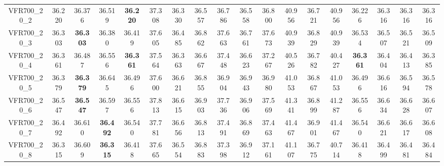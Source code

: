 \begin{tabular}{cc|ccc|ccccccccccccc}
VFR700\_20\_2      & 36.220           & 36.376           & 36.519           & {\bf 36.220}     & 37.308           & 36.330           & 36.557           & 36.786           & 36.558           & 36.800           & 40.956           & 36.721           & 40.956           & 36.226           & 36.316           & 36.316           & 36.316          \\ 
VFR700\_20\_3      & 36.303           & {\bf 36.303}     & 36.380           & 36.419           & 37.605           & 36.485           & 36.862           & 37.663           & 36.761           & 37.673           & 40.939           & 36.829           & 40.939           & 36.534           & 36.507           & 36.521           & 36.509          \\ 
VFR700\_20\_4      & 36.361           & 36.487           & 36.556           & {\bf 36.361}     & 37.564           & 36.363           & 36.667           & 37.448           & 36.623           & 37.267           & 40.526           & 36.782           & 40.427           & {\bf 36.361}     & 36.404           & 36.413           & 36.385          \\ 
VFR700\_20\_5      & 36.379           & {\bf 36.379}     & 36.645           & 36.496           & 37.600           & 36.621           & 36.855           & 36.904           & 36.943           & 36.980           & 41.053           & 36.867           & 41.053           & 36.496           & 36.616           & 36.594           & 36.578          \\ 
VFR700\_20\_6      & 36.547           & {\bf 36.547}     & 36.597           & 36.556           & 37.813           & 36.615           & 36.903           & 37.736           & 36.906           & 37.569           & 41.341           & 36.899           & 41.287           & 36.556           & 36.634           & 36.628           & 36.607          \\ 
VFR700\_20\_7      & 36.492           & 36.610           & {\bf 36.492}     & 36.540           & 37.781           & 36.656           & 36.813           & 37.491           & 36.869           & 37.463           & 41.467           & 36.901           & 41.467           & 36.540           & 36.621           & 36.617           & 36.608          \\ 
VFR700\_20\_8      & 36.315           & 36.609           & {\bf 36.315}     & 36.418           & 37.665           & 36.554           & 36.883           & 37.398           & 36.912           & 37.161           & 41.107           & 36.775           & 40.714           & 36.418           & 36.499           & 36.481           & 36.484          \\ 

\end{tabular}
